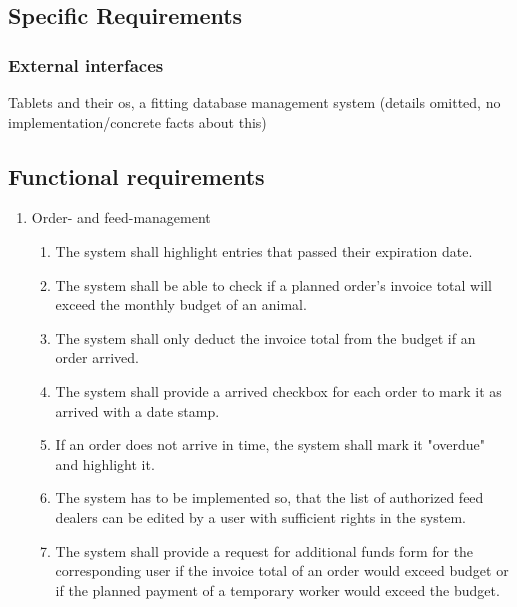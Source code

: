 	\subsection{Specific Requirements}

	\subsubsection{External interfaces}
	Tablets and their os, a fitting database management system (details omitted, no implementation/concrete facts about this)

	\subsection{Functional requirements}

\begin{enumerate}[1.]
\item Order- and feed-management
	\begin{enumerate}[1.]
	\item The system shall highlight entries that passed their expiration date.
	\item The system shall be able to check if a planned order’s invoice total will exceed the monthly budget of an animal.
	\item The system shall only deduct the invoice total from the budget if an order arrived.
	\item The system shall provide a arrived checkbox for each order to mark it as arrived with a date stamp.
	\item If an order does not arrive in time, the system shall mark it "overdue" and highlight it.
	\item The system has to be implemented so, that the list of authorized feed dealers can be edited by a user with sufficient rights in the system.
	\item The system shall provide a request for additional funds form for the corresponding user if the invoice total of an order would exceed budget or if the planned payment of a temporary worker would exceed the budget.
	\end{enumerate}


\end{enumerate}
